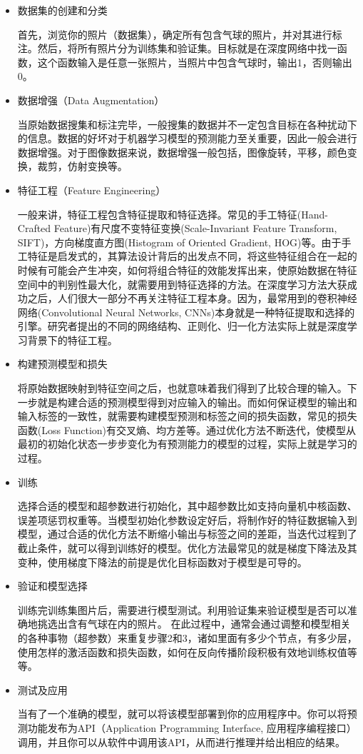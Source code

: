 \begin{itemize}
	\itemsep0em
	\item 数据集的创建和分类

		首先，浏览你的照片（数据集），确定所有包含气球的照片，并对其进行标注。然后，将所有照片分为训练集和验证集。目标就是在深度网络中找一函数，这个函数输入是任意一张照片，当照片中包含气球时，输出1，否则输出0。

\item 数据增强（Data Augmentation）

	当原始数据搜集和标注完毕，一般搜集的数据并不一定包含目标在各种扰动下的信息。数据的好坏对于机器学习模型的预测能力至关重要，因此一般会进行数据增强。对于图像数据来说，数据增强一般包括，图像旋转，平移，颜色变换，裁剪，仿射变换等。

\item 特征工程（Feature Engineering）

	一般来讲，特征工程包含特征提取和特征选择。常见的手工特征(Hand-Crafted Feature)有尺度不变特征变换(Scale-Invariant Feature Transform, SIFT)，方向梯度直方图(Histogram of Oriented Gradient, HOG)等。由于手工特征是启发式的，其算法设计背后的出发点不同，将这些特征组合在一起的时候有可能会产生冲突，如何将组合特征的效能发挥出来，使原始数据在特征空间中的判别性最大化，就需要用到特征选择的方法。在深度学习方法大获成功之后，人们很大一部分不再关注特征工程本身。因为，最常用到的卷积神经网络(Convolutional Neural Networks, CNNs)本身就是一种特征提取和选择的引擎。研究者提出的不同的网络结构、正则化、归一化方法实际上就是深度学习背景下的特征工程。

\item 构建预测模型和损失

	将原始数据映射到特征空间之后，也就意味着我们得到了比较合理的输入。下一步就是构建合适的预测模型得到对应输入的输出。而如何保证模型的输出和输入标签的一致性，就需要构建模型预测和标签之间的损失函数，常见的损失函数(Loss Function)有交叉熵、均方差等。通过优化方法不断迭代，使模型从最初的初始化状态一步步变化为有预测能力的模型的过程，实际上就是学习的过程。

\item 训练

	选择合适的模型和超参数进行初始化，其中超参数比如支持向量机中核函数、误差项惩罚权重等。当模型初始化参数设定好后，将制作好的特征数据输入到模型，通过合适的优化方法不断缩小输出与标签之间的差距，当迭代过程到了截止条件，就可以得到训练好的模型。优化方法最常见的就是梯度下降法及其变种，使用梯度下降法的前提是优化目标函数对于模型是可导的。

\item 验证和模型选择

	训练完训练集图片后，需要进行模型测试。利用验证集来验证模型是否可以准确地挑选出含有气球在内的照片。
	在此过程中，通常会通过调整和模型相关的各种事物（超参数）来重复步骤2和3，诸如里面有多少个节点，有多少层，使用怎样的激活函数和损失函数，如何在反向传播阶段积极有效地训练权值等等。

\item 测试及应用

	当有了一个准确的模型，就可以将该模型部署到你的应用程序中。你可以将预测功能发布为API（Application Programming Interface, 应用程序编程接口）调用，并且你可以从软件中调用该API，从而进行推理并给出相应的结果。
	\end{itemize}

